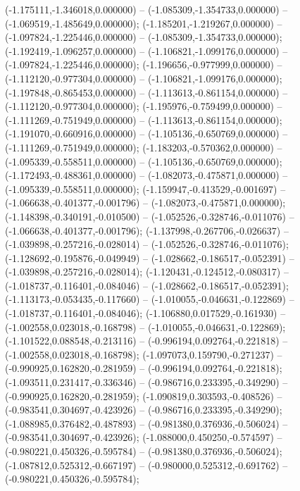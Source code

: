  (-1.175111,-1.346018,0.000000) -- (-1.085309,-1.354733,0.000000) -- (-1.069519,-1.485649,0.000000);
 (-1.185201,-1.219267,0.000000) -- (-1.097824,-1.225446,0.000000) -- (-1.085309,-1.354733,0.000000);
 (-1.192419,-1.096257,0.000000) -- (-1.106821,-1.099176,0.000000) -- (-1.097824,-1.225446,0.000000);
 (-1.196656,-0.977999,0.000000) -- (-1.112120,-0.977304,0.000000) -- (-1.106821,-1.099176,0.000000);
 (-1.197848,-0.865453,0.000000) -- (-1.113613,-0.861154,0.000000) -- (-1.112120,-0.977304,0.000000);
 (-1.195976,-0.759499,0.000000) -- (-1.111269,-0.751949,0.000000) -- (-1.113613,-0.861154,0.000000);
 (-1.191070,-0.660916,0.000000) -- (-1.105136,-0.650769,0.000000) -- (-1.111269,-0.751949,0.000000);
 (-1.183203,-0.570362,0.000000) -- (-1.095339,-0.558511,0.000000) -- (-1.105136,-0.650769,0.000000);
 (-1.172493,-0.488361,0.000000) -- (-1.082073,-0.475871,0.000000) -- (-1.095339,-0.558511,0.000000);
 (-1.159947,-0.413529,-0.001697) -- (-1.066638,-0.401377,-0.001796) -- (-1.082073,-0.475871,0.000000);
 (-1.148398,-0.340191,-0.010500) -- (-1.052526,-0.328746,-0.011076) -- (-1.066638,-0.401377,-0.001796);
 (-1.137998,-0.267706,-0.026637) -- (-1.039898,-0.257216,-0.028014) -- (-1.052526,-0.328746,-0.011076);
 (-1.128692,-0.195876,-0.049949) -- (-1.028662,-0.186517,-0.052391) -- (-1.039898,-0.257216,-0.028014);
 (-1.120431,-0.124512,-0.080317) -- (-1.018737,-0.116401,-0.084046) -- (-1.028662,-0.186517,-0.052391);
 (-1.113173,-0.053435,-0.117660) -- (-1.010055,-0.046631,-0.122869) -- (-1.018737,-0.116401,-0.084046);
 (-1.106880,0.017529,-0.161930) -- (-1.002558,0.023018,-0.168798) -- (-1.010055,-0.046631,-0.122869);
 (-1.101522,0.088548,-0.213116) -- (-0.996194,0.092764,-0.221818) -- (-1.002558,0.023018,-0.168798);
 (-1.097073,0.159790,-0.271237) -- (-0.990925,0.162820,-0.281959) -- (-0.996194,0.092764,-0.221818);
 (-1.093511,0.231417,-0.336346) -- (-0.986716,0.233395,-0.349290) -- (-0.990925,0.162820,-0.281959);
 (-1.090819,0.303593,-0.408526) -- (-0.983541,0.304697,-0.423926) -- (-0.986716,0.233395,-0.349290);
 (-1.088985,0.376482,-0.487893) -- (-0.981380,0.376936,-0.506024) -- (-0.983541,0.304697,-0.423926);
 (-1.088000,0.450250,-0.574597) -- (-0.980221,0.450326,-0.595784) -- (-0.981380,0.376936,-0.506024);
 (-1.087812,0.525312,-0.667197) -- (-0.980000,0.525312,-0.691762) -- (-0.980221,0.450326,-0.595784);

